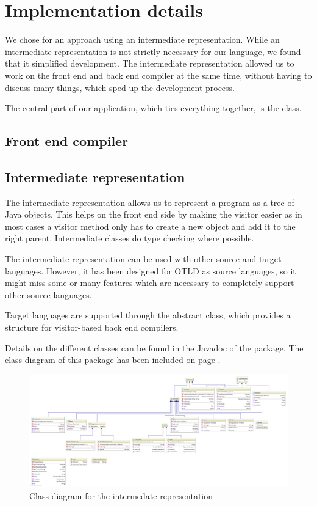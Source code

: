 \chapter{Implementation details}

We chose for an approach using an intermediate representation.
While an intermediate representation is not strictly necessary for our language, we found that it simplified development.
The intermediate representation allowed us to work on the front end and back end compiler at the same time, without having to discuss many things, which sped up the development process.

The central part of our application, which ties everything together, is the  class.

\section{Front end compiler}


\section{Intermediate representation}

The intermediate representation allows us to represent a program as a tree of Java objects.
This helps on the front end side by making the visitor easier as in most cases a visitor method only has to create a new object and add it to the right parent.
Intermediate classes do type checking where possible.

The intermediate representation can be used with other source and target languages.
However, it has been designed for OTLD as source languages, so it might miss some or many features which are necessary to completely support other source languages.

Target languages are supported through the abstract  class, which provides a structure for visitor-based back end compilers.

Details on the different classes can be found in the Javadoc of the  package. The class diagram of this package has been included on page \pageref{fig:class_diagram__intermediate}.

\begin{figure}[p]
\centering
\includegraphics{Images/class_diagram__intermediate}
\caption{Class diagram for the intermedate representation}
\label{fig:class_diagram__intermediate}
\end{figure}

